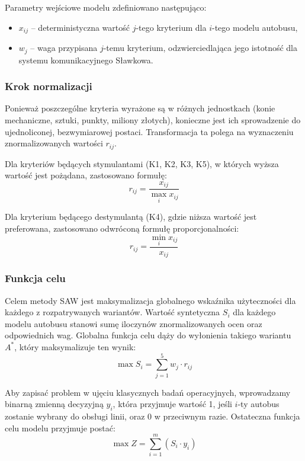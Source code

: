 Parametry wejściowe modelu zdefiniowano następująco:
\begin{itemize}
    \item $x_{ij}$ -- deterministyczna wartość $j$-tego kryterium dla $i$-tego modelu autobusu,
    \item $w_j$ -- waga przypisana $j$-temu kryterium, odzwierciedlająca jego istotność dla systemu komunikacyjnego Sławkowa.
\end{itemize}

\subsubsection*{Krok normalizacji}
Ponieważ poszczególne kryteria wyrażone są w różnych jednostkach (konie mechaniczne, sztuki, punkty, miliony złotych), konieczne jest ich sprowadzenie do ujednoliconej, bezwymiarowej postaci. Transformacja ta polega na wyznaczeniu znormalizowanych wartości $r_{ij}$.

Dla kryteriów będących stymulantami (K1, K2, K3, K5), w których wyższa wartość jest pożądana, zastosowano formułę:
\begin{equation}
r_{ij} = \frac{x_{ij}}{\max_i x_{ij}}
\end{equation}

Dla kryterium będącego destymulantą (K4), gdzie niższa wartość jest preferowana, zastosowano odwróconą formułę proporcjonalności:
\begin{equation}
r_{ij} = \frac{\min_i x_{ij}}{x_{ij}}
\end{equation}

\subsubsection*{Funkcja celu}
Celem metody SAW jest maksymalizacja globalnego wskaźnika użyteczności dla każdego z rozpatrywanych wariantów. Wartość syntetyczna $S_i$ dla każdego modelu autobusu stanowi sumę iloczynów znormalizowanych ocen oraz odpowiednich wag. Globalna funkcja celu dąży do wyłonienia takiego wariantu $A^*$, który maksymalizuje ten wynik:
\begin{equation}
\max S_i = \sum_{j=1}^{5} w_j \cdot r_{ij}
\end{equation}

Aby zapisać problem w ujęciu klasycznych badań operacyjnych, wprowadzamy binarną zmienną decyzyjną $y_i$, która przyjmuje wartość 1, jeśli $i$-ty autobus zostanie wybrany do obsługi linii, oraz 0 w przeciwnym razie. Ostateczna funkcja celu modelu przyjmuje postać:
\begin{equation}
\max Z = \sum_{i=1}^{m} (S_i \cdot y_i)
\end{equation}

